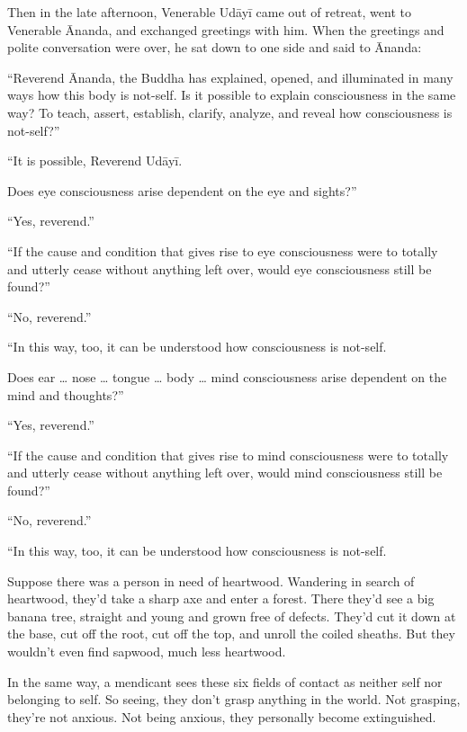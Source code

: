 \documentclass[12pt,openany]{book}%
\begin{document}
Then in the late afternoon, Venerable \textsanskrit{Udāyī} came out of retreat, went to Venerable Ānanda, and exchanged greetings with him. When the greetings and polite conversation were over, he sat down to one side and said to Ānanda: 

“Reverend Ānanda, the Buddha has explained, opened, and illuminated in many ways how this body is not-self. Is it possible to explain consciousness in the same way? To teach, assert, establish, clarify, analyze, and reveal how consciousness is not-self?” 

“It is possible, Reverend \textsanskrit{Udāyī}. 

Does eye consciousness arise dependent on the eye and sights?” 

“Yes, reverend.” 

“If the cause and condition that gives rise to eye consciousness were to totally and utterly cease without anything left over, would eye consciousness still be found?” 

“No, reverend.” 

“In this way, too, it can be understood how consciousness is not-self. 

Does ear … nose … tongue … body … mind consciousness arise dependent on the mind and thoughts?” 

“Yes, reverend.” 

“If the cause and condition that gives rise to mind consciousness were to totally and utterly cease without anything left over, would mind consciousness still be found?” 

“No, reverend.” 

“In this way, too, it can be understood how consciousness is not-self. 

Suppose there was a person in need of heartwood. Wandering in search of heartwood, they’d take a sharp axe and enter a forest. There they’d see a big banana tree, straight and young and grown free of defects. They’d cut it down at the base, cut off the root, cut off the top, and unroll the coiled sheaths. But they wouldn’t even find sapwood, much less heartwood. 

In the same way, a mendicant sees these six fields of contact as neither self nor belonging to self. So seeing, they don’t grasp anything in the world. Not grasping, they’re not anxious. Not being anxious, they personally become extinguished. 
\end{document}
